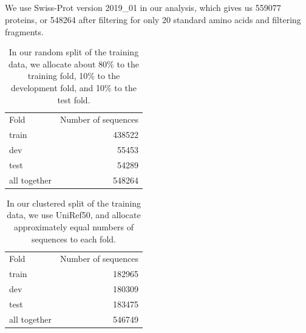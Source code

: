 \subsection{}
\addtocounter{subsection}{-1}%

\DIFdelend We use Swiss-Prot version 2019\_01 in our analysis, which gives us 559077 proteins, or 548264 after filtering for only 20 standard amino acids and filtering fragments.
\DIFaddbegin 


\DIFaddend \begin{table}[htbp]
  \centering
  \begin{tabular}{|l|r|}
  \hline
           Fold &  Number of sequences \\
  \Xhline{2pt}
          train &               438522 \\
  \hline
            dev &               55453 \\
  \hline
           test &               54289 \\
  \hline
   all together &               548264 \\
  \hline
  \end{tabular}
  \caption{In our random split of the training data, we allocate about 80\% to the training fold, 10\% to the development fold, and 10\% to the test fold.}
  \end{table}
  \begin{table}[htbp]
  \centering
  \begin{tabular}{|l|r|}
  \hline
           Fold &  Number of sequences \\
  \Xhline{2pt}
          train &               182965 \\
  \hline
            dev &               180309 \\
  \hline
           test &               183475 \\
  \hline
   all together &               546749 \\
  \hline
  \end{tabular}
  \caption{In our clustered split of the training data, we use UniRef50, and allocate approximately equal numbers of sequences to each fold.}
  \DIFaddbeginFL 

  \DIFaddendFL \end{table}
